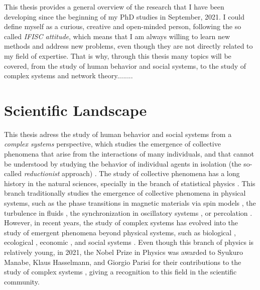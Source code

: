\setcounter{page}{1}

This thesis provides a general overview of the research that I have been developing since the beginning of my PhD studies in September, 2021. I could define myself as a curious, creative and open-minded person, following the so called \textit{IFISC attitude}, which means that I am always willing to learn new methods and address new problems, even though they are not directly related to my field of expertise. That is why, through this thesis many topics will be covered, from the study of human behavior and social systems, to the study of complex systems and network theory........

\section{\label{sec:scie_lands} Scientific Landscape}

This thesis adress the study of human behavior and social systems from a \textit{complex systems} perspective, which studies the emergence of collective phenomena that arise from the interactions of many individuals, and that cannot be understood by studying the behavior of individual agents in isolation (the so-called \textit{reductionist} approach) \cite{anderson1972more}. The study of collective phenomena has a long history in the natural sciences, specially in the branch of statistical physics \cite{stanley1971phase}. This branch traditionally studies the emergence of collective phenomena in physical systems, such as the phase transitions in magnetic materials via spin models \cite{onsager-1944}, the turbulence in fluids \cite{frisch1995turbulence}, the synchronization in oscillatory systems \cite{pikovsky2001universal}, or percolation \cite{stauffer-1985}. However, in recent years, the study of complex systems has evolved into the study of emergent phenomena beyond physical systems, such as biological \cite{prigogine1977self}, ecological \cite{may-2001}, economic \cite{arthur-1994}, and social systems \cite{castellano-2009}. Even though this branch of physics is relatively young, in 2021, the Nobel Prize in Physics was awarded to Syukuro Manabe, Klaus Hasselmann, and Giorgio Parisi for their contributions to the study of complex systems \cite{nobel-2021}, giving a recognition to this field in the scientific community.


